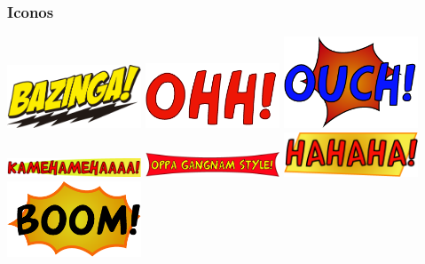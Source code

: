 \documentclass[utf8]{beamer}
\begin{document}
\begin{frame}
  \frametitle{Iconos}

       
 	\begin{center}
		\begingroup
			\includegraphics[width=0.30\textwidth]{imagenes/icono1.png}
			\hspace{1mm}
			\includegraphics[width=0.30\textwidth]{imagenes/icono2.png}
			\hspace{1mm}
			\includegraphics[width=0.30\textwidth]{imagenes/icono3.png}
			\hspace{1mm}
			\includegraphics[width=0.30\textwidth]{imagenes/icono4.png}
			\hspace{1mm}
			\includegraphics[width=0.30\textwidth]{imagenes/icono5.png}
			\hspace{1mm}
			\includegraphics[width=0.30\textwidth]{imagenes/icono6.png}
			\hspace{1mm}
			\includegraphics[width=0.30\textwidth]{imagenes/icono7.png}
		\endgroup
	\end{center}


\end{frame}
\end{document}
